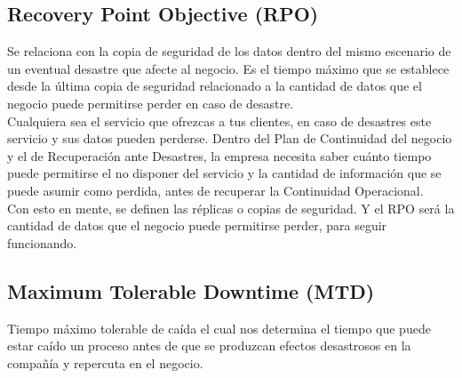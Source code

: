 \documentclass[conference]{IEEEtran}
\begin{document}
\subsection{Recovery Point Objective (RPO)}
Se relaciona con la copia de seguridad de los datos dentro del mismo escenario de un eventual desastre que afecte al negocio. Es el tiempo máximo que se establece desde la última copia de seguridad relacionado a la cantidad de datos que el negocio puede permitirse perder en caso de desastre.
\\
Cualquiera sea el servicio que ofrezcas a tus clientes, en caso de desastres este servicio y sus datos pueden perderse. Dentro del Plan de Continuidad del negocio y el de Recuperación ante Desastres, la empresa necesita saber cuánto tiempo puede permitirse el no disponer del servicio y la cantidad de información que se puede asumir como perdida, antes de recuperar la Continuidad Operacional.
\\
Con esto en mente, se definen las réplicas o copias de seguridad. Y el RPO será la cantidad de datos que el negocio puede permitirse perder, para seguir funcionando.

\subsection{Maximum Tolerable Downtime (MTD)}
Tiempo máximo tolerable de caída el cual nos determina el tiempo que puede estar caído un proceso antes de que se produzcan efectos desastrosos en la compañía y repercuta en el negocio.
\end{document}
